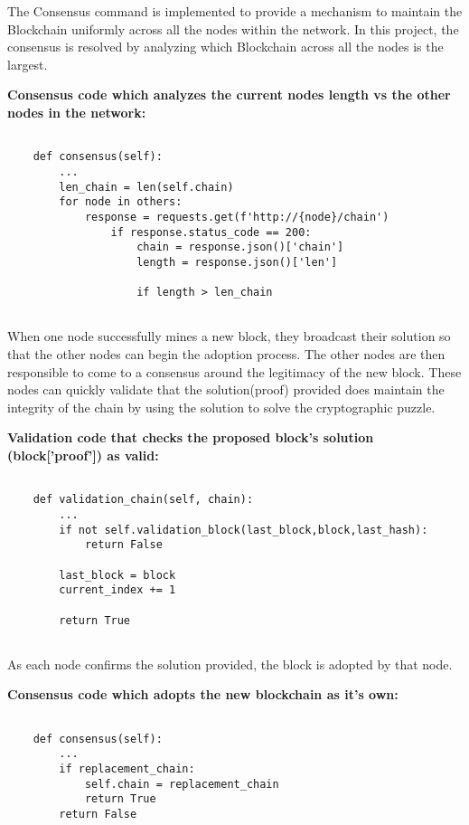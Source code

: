 The Consensus command is implemented to provide a mechanism to maintain the Blockchain 
uniformly across all the nodes within the network. In this project, the consensus is resolved 
by analyzing which Blockchain across all the nodes is the largest. 

\bigskip
\noindent
\textbf{Consensus code which analyzes the current nodes length vs the other nodes in the
network:}
\begin{footnotesize}
\begin{verbatim}

    def consensus(self):
        ...
        len_chain = len(self.chain)
        for node in others:
            response = requests.get(f'http://{node}/chain')
                if response.status_code == 200:
                	chain = response.json()['chain']
                    length = response.json()['len']

                    if length > len_chain
            
\end{verbatim}
\end{footnotesize}
When one node successfully mines a new block, they broadcast their solution so that the other 
nodes can begin the adoption process. The other nodes are then responsible to come to a 
consensus around the legitimacy of the new block. These nodes can quickly validate that the 
solution(proof) provided does maintain the integrity of the chain by using the solution to 
solve the cryptographic puzzle. 

\bigskip
\noindent
\textbf{Validation code that checks the proposed block's solution
(\textbf{block['proof']}) as valid:}
\begin{footnotesize}
\begin{verbatim}

    def validation_chain(self, chain):
        ...
        if not self.validation_block(last_block,block,last_hash):
            return False

        last_block = block
        current_index += 1

        return True
	
\end{verbatim}
\end{footnotesize}
\bigskip
\noindent
As each node confirms the solution provided, the block is adopted by that node.

\bigskip
\noindent
\textbf{Consensus code which adopts the new blockchain 
as it's own:}
\begin{footnotesize}
\begin{verbatim}

    def consensus(self):
        ...
	    if replacement_chain:
            self.chain = replacement_chain
            return True
        return False
	
\end{verbatim}
\end{footnotesize}

